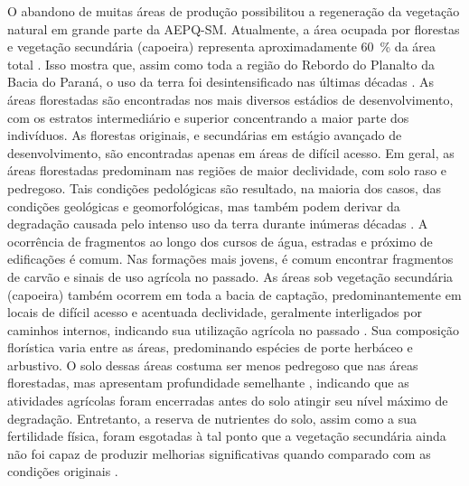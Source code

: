 
O abandono de muitas áreas de produção possibilitou a regeneração da vegetação natural em grande 
parte da AEPQ-SM. Atualmente, a área ocupada por florestas e vegetação secundária (capoeira) 
representa aproximadamente \SI{60}{\percent} da área total \cite{SamuelRosaEtAl2011a}. Isso mostra 
que, assim como toda a região do Rebordo do Planalto da Bacia do Paraná, o uso da terra foi 
desintensificado nas últimas décadas \cite{SEMA/UFSM2001, DillEtAl2004, Poelking2007, Miguel2010, 
SamuelRosaEtAl2011a, Dullius2012, tenCatenEtAl2012}. As áreas florestadas são encontradas nos mais 
diversos estádios de desenvolvimento, com os estratos intermediário e superior concentrando a maior 
parte dos indivíduos. As florestas originais, e secundárias em estágio avançado de desenvolvimento, 
são encontradas apenas em áreas de difícil acesso. Em geral, as áreas florestadas predominam nas 
regiões de maior declividade, com solo raso e pedregoso. Tais condições pedológicas são resultado, 
na maioria dos casos, das condições geológicas e geomorfológicas, mas também podem derivar da 
degradação causada pelo intenso uso da terra durante inúmeras décadas \cite{SamuelRosaEtAl2011a}. 
A ocorrência de fragmentos ao longo dos cursos de água, estradas e próximo de edificações é comum. 
Nas formações mais jovens, é comum encontrar fragmentos de carvão e sinais de uso agrícola no 
passado. As áreas sob vegetação secundária (capoeira) também ocorrem em toda a bacia de captação, 
predominantemente em locais de difícil acesso e acentuada declividade, geralmente interligados por 
caminhos internos, indicando sua utilização agrícola no passado \cite{SamuelRosaEtAl2011a}. Sua 
composição florística varia entre as áreas, predominando espécies de porte herbáceo e arbustivo. O 
solo dessas áreas costuma ser menos pedregoso que nas áreas florestadas, mas apresentam profundidade
semelhante \cite{SamuelRosaEtAl2011a}, indicando que as atividades agrícolas foram encerradas antes
do solo atingir seu nível máximo de degradação. Entretanto, a reserva de nutrientes do solo, assim 
como a sua fertilidade física, foram esgotadas à tal ponto que a vegetação secundária ainda não foi 
capaz de produzir melhorias significativas quando comparado com as condições originais 
\cite{Menezes2008, Zalamena2008}.

